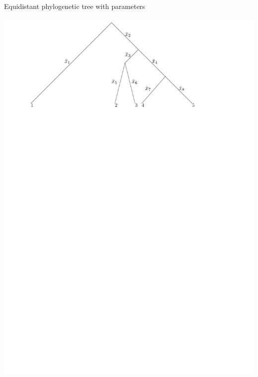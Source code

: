 \documentclass{beamer}
\begin{document}
\begin{frame}{Equidistant phylogenetic tree with parameters}
\begin{definition}
\includegraphics[width=\framewidth]{rooted_time_parameters}
\end{definition}
\end{frame}
\end{document}
